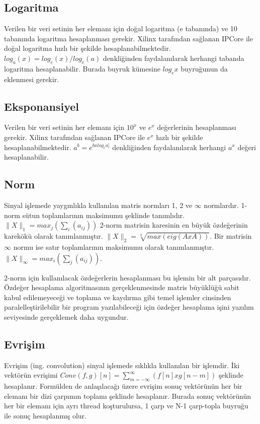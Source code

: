 \subsection{Logaritma}
Verilen bir veri setinin her elemanı için doğal logaritma (e tabanında) ve 10 tabanında logaritma hesaplanması gerekir. Xilinx tarafından sağlanan IPCore ile doğal logaritma hızlı bir şekilde hesaplanabilmektedir. 
$log_{a}(x) = log_{e}(x) / log_{e}(a)$ 
denkliğinden faydalanılarak herhangi tabanda logaritma hesaplanabilir. Burada buyruk kümesine $log_{e}x$ buyruğunun da eklenmesi gerekir.

\subsection{Eksponansiyel}
Verilen bir veri setinin her elemanı için $10^{x}$ ve $e^{x}$ değerlerinin hesaplanması gerekir. Xilinx tarafından sağlanan IPCore ile $e^{x}$ hızlı bir şekilde hesaplanabilmektedir. $a^{b} = e^{b x log_{e}{a]}}$ denkliğinden faydalanılarak herhangi $a^{x}$ değeri hesaplanabilir.

\subsection{Norm}
Sinyal işlemede yaygınlıkla kullanılan matris normları 1, 2 ve $\infty$ normlardır. 1-norm sütun toplamlarının maksimumu şeklinde tanımlıdır. 
$\|X\|_{1} = max_{j}(\sum_{i}(a_{ij}))$ 2-norm matrisin karesinin en büyük özdeğerinin karekökü olarak tanımlanmıştır. $\|X\|_{2} = \sqrt[2]{max(eig(AxA))}$. Bir matrisin $\infty$ normu ise satır toplamlarının maksimumu olarak tanımlanmıştır. $\|X\|_{\infty} = max_{i}(\sum_{j}(a_{ij}))$.\cite{smith1997matlab}\par
2-norm için kullanılacak özdeğerlerin hesaplanması bu işlemin bir alt parçasıdır. Özdeğer hesaplama algoritmasının gerçeklenmesinde matris büyüklüğü sabit kabul edilemeyeceği ve toplama ve kaydırma gibi temel işlemler cinsinden paralelleştirilebilir bir program yazılabileceği için özdeğer hesaplama işini yazılım seviyesinde gerçeklemek daha uygundur.\cite{eigenvalueComputation} \par

\subsection{Evrişim}
Evrişim (ing. convolution) sinyal işlemede sıklıkla kullanılan bir işlemdir. İki vektörün evrişimi $Conv(f,g)[n]=\sum_{m=-\infty}^{\infty}(f[n]xg[n-m])$ şeklinde hesaplanır. Formülden de anlaşılacağı üzere evrişim sonuç vektörünün her bir elemanı bir dizi çarpımın toplamı şeklinde hesaplanır. Burada sonuç vektörünün her bir elemanı için ayrı thread koşturulursa, 1 çarp ve N-1 çarp-topla buyruğu ile sonuç hesaplanmış olur. 

